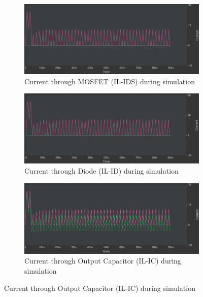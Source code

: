 \begin{figure}[h!]
    \centering
    \begin{subfigure}{0.45\linewidth}
        \centering
        \includegraphics[width=\linewidth]{img/hfd2/IL-IDS-7.png}
        \caption{Current through MOSFET (IL-IDS) during simulation}
        \label{fig:IL-IDS-7}
    \end{subfigure}
    \begin{subfigure}{0.45\linewidth}
        \centering
        \includegraphics[width=\linewidth]{img/hfd2/IL-ID-7.png}
        \caption{Current through Diode (IL-ID) during simulation}
        \label{fig:IL-ID-7}
    \end{subfigure}
    \begin{subfigure}{0.45\linewidth}
        \centering
        \includegraphics[width=\linewidth]{img/hfd2/IL-IC-7.png}
        \caption{Current through Output Capacitor (IL-IC) during simulation}
        \label{fig:IL-IC-7}
    \end{subfigure}

\end{figure}

